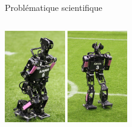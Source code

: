 \begin{frame}{Problématique scientifique}
\begin{columns}
\begin{column}{0.44\linewidth}
            \includegraphics[height=4.0cm]{../media/sigmaban_1_6.png}
            \includegraphics[height=4.0cm]{../media/grosban_1_2.png}
        \end{column}
    \end{columns}
\end{frame}

